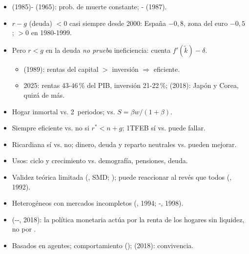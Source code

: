 \documentclass{article}
\begin{document}
\begin{columnas}
\begin{itemize}
\item {} (1985)- (1965): prob. de muerte constante; - (1987).
\end{itemize}
\begin{itemize}
\item $r-g$ (deuda) $<0$ casi siempre desde 2000: España $-0{,}8$, zona del euro $-0{,}5$; $>0$ en 1980-1999.
\end{itemize}
\begin{itemize}
\item Pero $r<g$ en la deuda \emph{no prueba} ineficiencia: cuenta $f'(\tilde k)-\delta$.
  \begin{itemize}
  \item {} (1989): rentas del capital $>$ inversión $\Rightarrow$ eficiente.
  \item 2025: rentas 43-46\,\% del PIB, inversión 21-22\,\%;  (2018): Japón y Corea, quizá de más.
  \end{itemize}
\end{itemize}
\begin{itemize}
\item Hogar inmortal vs. 2~periodos;  vs. $S=\beta w/(1+\beta)$.
\item Siempre eficiente vs. no si $r^*<n+g$; 1TFEB sí vs. puede fallar.
\item Ricardiana sí vs. no; dinero, deuda y reparto neutrales vs. pueden mejorar.
\item Usos: ciclo y crecimiento vs. demografía, pensiones, deuda.
\end{itemize}
\begin{itemize}
\item Validez teórica limitada (, SMD;  ); puede reaccionar al revés que todos (, 1992).
\item Heterogéneos con mercados incompletos (, 1994; -, 1998).
\item {} (--, 2018): la política monetaria actúa por la renta de los hogares sin liquidez, no por  .
\item Basados en agentes; comportamiento ();  (2018): convivencia.
\end{itemize}


\end{columnas}
\end{document}
